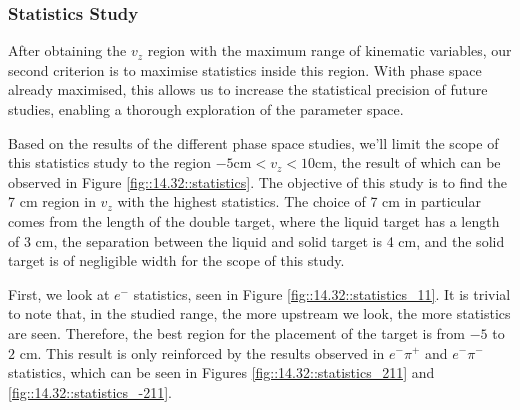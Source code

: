\subsubsection{Statistics Study}
\label{14.32::statistics_study}
    After obtaining the $v_z$ region with the maximum range of kinematic variables, our second criterion is to maximise statistics inside this region.
    With phase space already maximised, this allows us to increase the statistical precision of future studies, enabling a thorough exploration of the parameter space.

    Based on the results of the different phase space studies, we'll limit the scope of this statistics study to the region $-5 \text{cm} < v_z < 10 \text{cm}$, the result of which can be observed in Figure \ref{fig::14.32::statistics}.
    The objective of this study is to find the 7 cm region in $v_z$ with the highest statistics.
    The choice of 7 cm in particular comes from the length of the double target, where the liquid target has a length of 3 cm, the separation between the liquid and solid target is 4 cm, and the solid target is of negligible width for the scope of this study.

    First, we look at $e^-$ statistics, seen in Figure \ref{fig::14.32::statistics_11}.
    It is trivial to note that, in the studied range, the more upstream we look, the more statistics are seen.
    Therefore, the best region for the placement of the target is from $-5$ to $2$ cm.
    This result is only reinforced by the results observed in $e^-\pi^+$ and $e^-\pi^-$ statistics, which can be seen in Figures \ref{fig::14.32::statistics_211} and \ref{fig::14.32::statistics_-211}.

